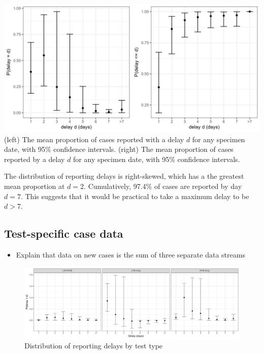 \documentclass[
  a4paper,
]{article}
\providecommand{\tightlist}{%
  \setlength{\itemsep}{0pt}\setlength{\parskip}{0pt}}\usepackage{longtable,booktabs,array}
\begin{document}
\includegraphics{images/cases-delay-dist.png} (left) The mean proportion
of cases reported with a delay \(d\) for any specimen date, with 95\%
confidence intervals. (right) The mean proportion of cases reported by a
delay \(d\) for any specimen date, with 95\% confidence intervals.

The distribution of reporting delays is right-skewed, which has a the
greatest mean proportion at \(d=2\). Cumulatively, 97.4\% of cases are
reported by day \(d=7\). This suggests that it would be practical to
take a maximum delay to be \(d>7\).

\hypertarget{test-specific-case-data}{%
\subsection{Test-specific case data}\label{test-specific-case-data}}

\begin{itemize}
\tightlist
\item
  Explain that data on new cases is the sum of three separate data
  streams
\end{itemize}

\begin{figure}

{\centering \includegraphics{images/delay-dist-test-type.png}

}

\caption{Distribution of reporting delays by test type}

\end{figure}
\end{document}
